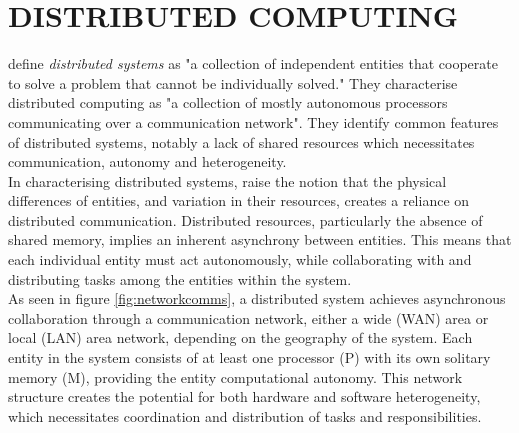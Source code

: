 \documentclass[../report.tex]{subfiles}
\begin{document}
\section{DISTRIBUTED COMPUTING}

\cite{kshemkalyani2011distributed} define \textit{distributed systems} as "a collection of independent entities that cooperate to solve a problem that cannot be individually solved." They characterise distributed computing as  "a collection of mostly autonomous processors communicating over a communication network". They identify common features of distributed systems, notably a lack of shared resources which necessitates communication, autonomy and heterogeneity. \\

In characterising distributed systems, \cite{kshemkalyani2011distributed} raise the notion that the physical differences of entities, and variation in their resources, creates a reliance on distributed communication. Distributed resources, particularly the absence of shared memory, implies an inherent asynchrony between entities. This means that each individual entity must act autonomously, while collaborating with and distributing tasks among the entities within the system. \\

As seen in figure \ref{fig:networkcomms}, a distributed system achieves asynchronous collaboration through a communication network, either a wide (WAN) area or local (LAN) area network, depending on the geography of the system. Each entity in the system consists of at least one processor (P) with its own solitary memory (M), providing the entity computational autonomy. This network structure creates the potential for both hardware and software heterogeneity, which necessitates coordination and distribution of tasks and responsibilities.
\end{document}
